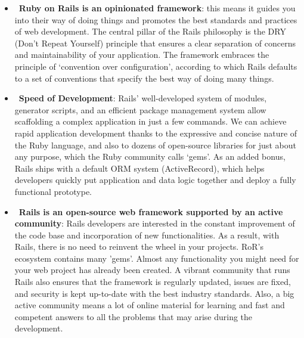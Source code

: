 \begin{itemize}
\item~\textbf{Ruby on Rails is an opinionated framework}: this means it guides you into their way of doing things and promotes the best standards and practices of web development. The central pillar of the Rails philosophy is the DRY (Don’t Repeat Yourself) principle that ensures a clear separation of concerns and maintainability of your application. The framework embraces the principle of ‘convention over configuration’, according to which Rails defaults to a set of conventions that specify the best way of doing many things.

\item~\textbf{Speed of Development}: Rails' well-developed system of modules, generator scripts, and an efficient package management system allow scaffolding a complex application in just a few commands. We can achieve rapid application development thanks to the expressive and concise nature of the Ruby language, and also to dozens of open-source libraries for just about any purpose, which the Ruby community calls ‘gems’. As an added bonus, Rails ships with a default ORM system (ActiveRecord), which helps developers quickly put application and data logic together and deploy a fully functional prototype.

\item~\textbf{Rails is an open-source web framework supported by an active community}: Rails developers are interested in the constant improvement of the code base and incorporation of new functionalities. As a result, with Rails, there is no need to reinvent the wheel in your projects. RoR’s ecosystem contains many 'gems'. Almost any functionality you might need for your web project has already been created. A vibrant community that runs Rails also ensures that the framework is regularly updated, issues are fixed, and security is kept up-to-date with the best industry standards. Also, a big active community means a lot of online material for learning and fast and competent answers to all the problems that may arise during the development.
\end{itemize}